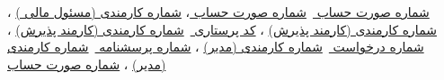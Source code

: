 \documentclass{article}
\begin{document}
، 
\underline{شماره صورت حساب }
\newline
\newline
{}
 \underline{شماره صورت حساب }
، 
\underline{شماره کارمندی (مسئول مالی ) }
\newline
\newline
{}
 \underline{شماره کارمندی (کارمند پذیرش)}
، 
\underline{کد پرستاری }
\newline
\newline
{}
 \underline{شماره کارمندی (کارمند پذیرش)}
، 
\underline{شماره درخواست  }
\newline
\newline
{}
 \underline{شماره کارمندی (مدیر)}
، 
\underline{شماره پرسشنامه }
\newline
\newline
{}
 \underline{شماره کارمندی (مدیر)}
، 
\underline{شماره صورت حساب  }
\end{document}
